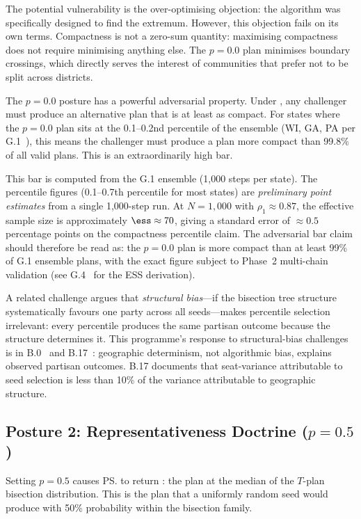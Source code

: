 The potential vulnerability is the over-optimising objection: the algorithm
was specifically designed to find the extremum.
However, this objection fails on its own terms.
Compactness is not a zero-sum quantity: maximising compactness does not
require minimising anything else.
The $p = 0.0$ plan minimises boundary crossings, which directly serves the
interest of communities that prefer not to be split across districts.

The $p = 0.0$ posture has a powerful adversarial property.
Under \karcher{}, any challenger must produce an alternative plan that
is at least as compact.
For states where the $p = 0.0$ plan sits at the 0.1--0.2nd percentile
of the \recom{} ensemble (WI, GA, PA per G.1~\citep{g1paper}), this means
the challenger must produce a plan more compact than 99.8\% of all valid
plans.
This is an extraordinarily high bar.

This bar is computed from the G.1 \gc{} ensemble (1{,}000 steps per state).
The percentile figures (0.1--0.7th percentile for most states) are
\emph{preliminary point estimates} from a single 1{,}000-step run.
At $N = 1{,}000$ with $\rho_1 \approx 0.87$, the effective sample size is
approximately $\ess \approx 70$, giving a standard error of $\approx 0.5$
percentage points on the compactness percentile claim.
The adversarial bar claim should therefore be read as: the $p{=}0.0$ plan is
more compact than at least 99\% of G.1 ensemble plans, with the exact
figure subject to Phase~2 multi-chain validation
(see G.4~\citep{dellaLibera2026g4} for the ESS derivation).

A related challenge argues that \emph{structural bias}---if the bisection
tree structure systematically favours one party across all seeds---makes
percentile selection irrelevant: every percentile produces the same partisan
outcome because the structure determines it.
This programme's response to structural-bias challenges is in
B.0~\cite{deluca2026bakeoff} and B.17~\cite{deluca2026sensitivity}:
geographic determinism, not algorithmic bias, explains observed partisan
outcomes.
B.17 documents that seat-variance attributable to seed selection is less
than 10\% of the variance attributable to geographic structure.

\subsection{Posture 2: Representativeness Doctrine ($p = 0.5$)}

Setting $p = 0.5$ causes \ps{} to return \ms{}: the plan at the median of
the $T$-plan bisection distribution.
This is the plan that a uniformly random seed would produce with 50\%
probability within the bisection family.


